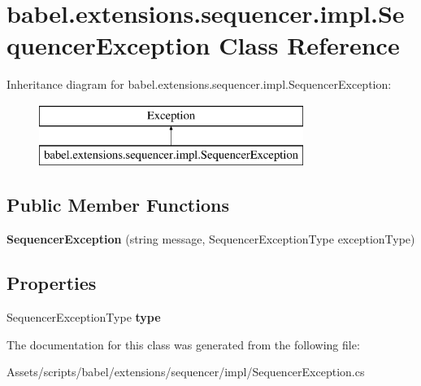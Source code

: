 \hypertarget{classbabel_1_1extensions_1_1sequencer_1_1impl_1_1_sequencer_exception}{\section{babel.\-extensions.\-sequencer.\-impl.\-Sequencer\-Exception Class Reference}
\label{classbabel_1_1extensions_1_1sequencer_1_1impl_1_1_sequencer_exception}
}
Inheritance diagram for babel.\-extensions.\-sequencer.\-impl.\-Sequencer\-Exception\-:\begin{figure}[H]
\begin{center}
\leavevmode
\includegraphics[height=2.000000cm]{classbabel_1_1extensions_1_1sequencer_1_1impl_1_1_sequencer_exception}
\end{center}
\end{figure}
\subsection*{Public Member Functions}
\begin{DoxyCompactItemize}
\item 
\hypertarget{classbabel_1_1extensions_1_1sequencer_1_1impl_1_1_sequencer_exception_a8b051b71bd7ed89e8c197cefd9fcbe4e}{{\bfseries Sequencer\-Exception} (string message, Sequencer\-Exception\-Type exception\-Type)}\label{classbabel_1_1extensions_1_1sequencer_1_1impl_1_1_sequencer_exception_a8b051b71bd7ed89e8c197cefd9fcbe4e}

\end{DoxyCompactItemize}
\subsection*{Properties}
\begin{DoxyCompactItemize}
\item 
\hypertarget{classbabel_1_1extensions_1_1sequencer_1_1impl_1_1_sequencer_exception_a2a005414b4f7f4baa9eefa86b211b5fe}{Sequencer\-Exception\-Type {\bfseries type}}\label{classbabel_1_1extensions_1_1sequencer_1_1impl_1_1_sequencer_exception_a2a005414b4f7f4baa9eefa86b211b5fe}

\end{DoxyCompactItemize}


The documentation for this class was generated from the following file\-:\begin{DoxyCompactItemize}
\item 
Assets/scripts/babel/extensions/sequencer/impl/Sequencer\-Exception.\-cs\end{DoxyCompactItemize}

